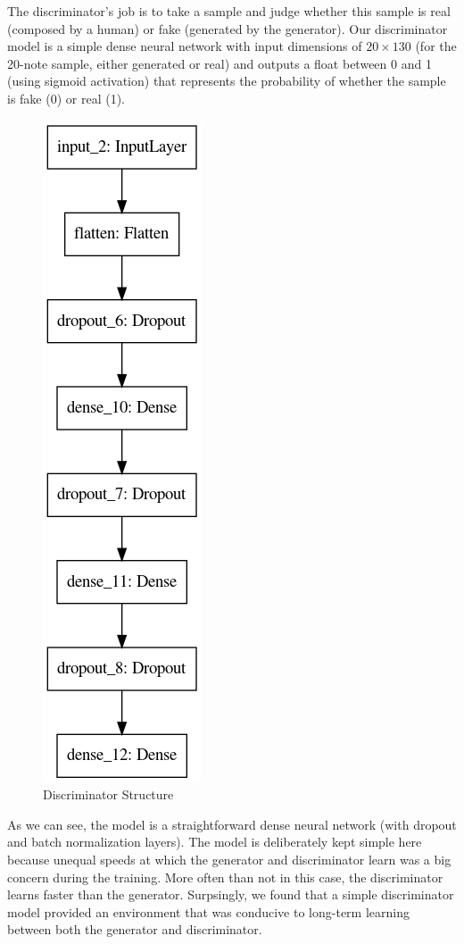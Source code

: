 \documentclass[12pt,oneside]{chicagocapstone}
\begin{document}
The discriminator's job is to take a sample and judge whether this sample is real (composed by a human) or fake (generated by the generator). Our discriminator model is a simple dense neural network with input dimensions of \(20\times130\) (for the 20-note sample, either generated or real) and outputs a float between 0 and 1 (using sigmoid activation) that represents the probability of whether the sample is fake (0) or real (1).
\begin{figure}

{\centering \includegraphics[width=0.3\linewidth]{figure/dis_model} 

}

\caption{Discriminator Structure}\label{fig:unnamed-chunk-6}
\end{figure}
As we can see, the model is a straightforward dense neural network (with dropout and batch normalization layers). The model is deliberately kept simple here because unequal speeds at which the generator and discriminator learn was a big concern during the training. More often than not in this case, the discriminator learns faster than the generator. Surpsingly, we found that a simple discriminator model provided an environment that was conducive to long-term learning between both the generator and discriminator.
\end{document}
